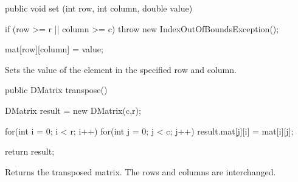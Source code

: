 \begin{code}

   public void set (int row, int column, double value) \begin{hide} {
      if (row >= r || column >= c)
         throw new IndexOutOfBoundsException();

      mat[row][column] = value;
   } \end{hide}
\end{code}
\begin{tabb} Sets the value of the element in the specified row and column.
\end{tabb}
\begin{htmlonly}
\end{htmlonly}
\begin{code}

   public DMatrix transpose() \begin{hide} {
      DMatrix result = new DMatrix(c,r);

      for(int i = 0; i < r; i++)
         for(int j = 0; j < c; j++)
            result.mat[j][i] = mat[i][j];

      return result;
   } \end{hide}
\end{code}
\begin{tabb} Returns the transposed matrix. The rows and columns are
  interchanged.
\end{tabb}
\begin{htmlonly}
\end{htmlonly}

\begin{code}
\begin{hide}
}
\end{hide}
\end{code}
